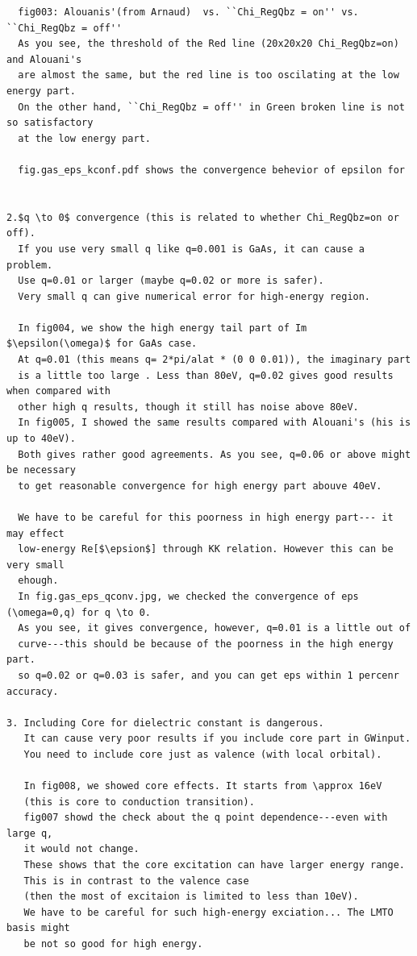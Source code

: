 \documentclass[a4paper,10pt,epsf,fleqn]{article}
\begin{document}
{{{\begin{verbatim}
  fig003: Alouanis'(from Arnaud)  vs. ``Chi_RegQbz = on'' vs. ``Chi_RegQbz = off''
  As you see, the threshold of the Red line (20x20x20 Chi_RegQbz=on) and Alouani's 
  are almost the same, but the red line is too oscilating at the low energy part.
  On the other hand, ``Chi_RegQbz = off'' in Green broken line is not so satisfactory
  at the low energy part. 

  fig.gas_eps_kconf.pdf shows the convergence behevior of epsilon for 
  
   
2.$q \to 0$ convergence (this is related to whether Chi_RegQbz=on or off).
  If you use very small q like q=0.001 is GaAs, it can cause a problem.
  Use q=0.01 or larger (maybe q=0.02 or more is safer). 
  Very small q can give numerical error for high-energy region.

  In fig004, we show the high energy tail part of Im $\epsilon(\omega)$ for GaAs case.
  At q=0.01 (this means q= 2*pi/alat * (0 0 0.01)), the imaginary part
  is a little too large . Less than 80eV, q=0.02 gives good results when compared with
  other high q results, though it still has noise above 80eV.
  In fig005, I showed the same results compared with Alouani's (his is up to 40eV).
  Both gives rather good agreements. As you see, q=0.06 or above might be necessary
  to get reasonable convergence for high energy part abouve 40eV.

  We have to be careful for this poorness in high energy part--- it may effect
  low-energy Re[$\epsion$] through KK relation. However this can be very small
  ehough.
  In fig.gas_eps_qconv.jpg, we checked the convergence of eps (\omega=0,q) for q \to 0.
  As you see, it gives convergence, however, q=0.01 is a little out of 
  curve---this should be because of the poorness in the high energy part.
  so q=0.02 or q=0.03 is safer, and you can get eps within 1 percenr accuracy.

3. Including Core for dielectric constant is dangerous. 
   It can cause very poor results if you include core part in GWinput.
   You need to include core just as valence (with local orbital).

   In fig008, we showed core effects. It starts from \approx 16eV 
   (this is core to conduction transition).
   fig007 showd the check about the q point dependence---even with large q,
   it would not change.
   These shows that the core excitation can have larger energy range.
   This is in contrast to the valence case 
   (then the most of excitaion is limited to less than 10eV).
   We have to be careful for such high-energy exciation... The LMTO basis might
   be not so good for high energy.


\end{verbatim}}}}
\end{document}
